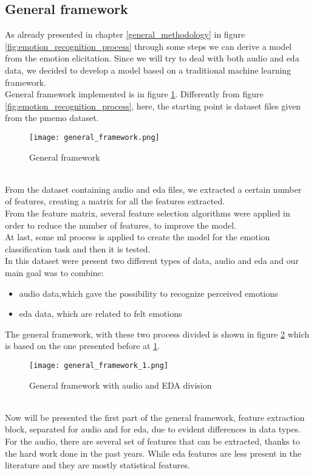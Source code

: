 \subsection{General framework}
As already presented in chapter \ref{general_methodology} in figure \ref{fig:emotion_recognition_process} through some steps we can derive a model from the emotion elicitation. Since we will try to deal with both audio and \gls{eda} data, we decided to develop a model based on a traditional machine learning framework.
\\
General framework implemented is in figure \ref{fig:general_framework}. Differently from figure \ref{fig:emotion_recognition_process}, here, the starting point is dataset files given from the \gls{pmemo} dataset.
\begin{figure}[h]
    \centering
    \texttt{[image: general\_framework.png]} 
	\caption{General framework}
    \label{fig:general_framework}
\end{figure}
\\
From the dataset containing audio and \gls{eda} files, we extracted a certain number of features, creating a matrix for all the features extracted.
\\
From the feature matrix, several feature selection algorithms were applied in order to reduce the number of features, to improve the model.
\\
At last, some \gls{ml} process is applied to create the model for the emotion classification task and then it is tested.
\\
In this dataset were present two different types of data, audio and \gls{eda} and our main goal was to combine:
\begin{itemize}
	\item audio data,which gave the possibility to recognize perceived emotions
	\item \gls{eda} data, which are related to felt emotions
\end{itemize}
The general framework, with these two process divided is shown in figure \ref{fig:general_framework_1} which is based on the one presented before at \ref{fig:general_framework}.
\begin{figure}[h]
    \centering
    \texttt{[image: general\_framework\_1.png]} 
	\caption{General framework with audio and EDA division}
    \label{fig:general_framework_1}
\end{figure}
\\[5px]
Now will be presented the first part of the general framework, feature extraction block, separated for audio and for \gls{eda}, due to evident differences in data types. For the audio, there are several set of features that can be extracted, thanks to the hard work done in the past years. While \gls{eda} features are less present in the literature and they are mostly statistical features.

